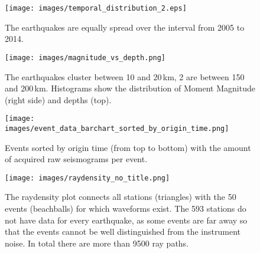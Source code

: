 
\begin{figure}[h]
\begin{center}
\texttt{[image: images/temporal\_distribution\_2.eps]}
\caption{The earthquakes are equally spread over the interval from 2005 to 2014.}
\label{temp_dist}
\end{center}
\end{figure}

\begin{figure}[h]
\begin{center}
\texttt{[image: images/magnitude\_vs\_depth.png]}
\caption{The earthquakes cluster between 10 and 20\,km, 2 are between 150 and 200\,km. 
Histograms show the distribution of Moment Magnitude (right side) and depths (top).}
\label{depth_scatter}
\end{center}
\end{figure}

\begin{figure}[h]
\begin{center}
\texttt{[image: images/event\_data\_barchart\_sorted\_by\_origin\_time.png]}
\caption{Events sorted by origin time (from top to bottom) with the amount of acquired raw seismograms per event.}
\label{event_data}
\end{center}
\end{figure}


\begin{figure}[H]
\begin{center}
\texttt{[image: images/raydensity\_no\_title.png]}
\caption{The raydensity plot connects all stations (triangles) with the 50 events (beachballs) for which waveforms exist. 
The 593 stations do not have data for every earthquake, as some events are far away so that the events cannot be well
distinguished from the instrument noise. In total there are more than 9500 ray paths.}
\label{raydens}
\end{center}
\end{figure}

